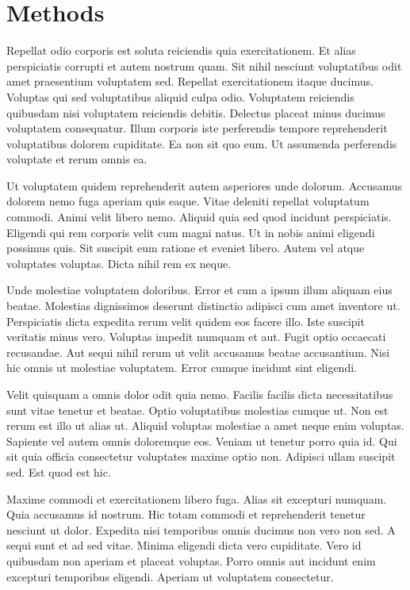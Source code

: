 \chapter{Methods\label{methods}}


Repellat odio corporis est soluta reiciendis quia exercitationem. Et alias perspiciatis corrupti et autem nostrum quam. Sit nihil nesciunt voluptatibus odit amet praesentium voluptatem sed. Repellat exercitationem itaque ducimus. Voluptas qui sed voluptatibus aliquid culpa odio. Voluptatem reiciendis quibusdam nisi voluptatem reiciendis debitis. Delectus placeat minus ducimus voluptatem consequatur. Illum corporis iste perferendis tempore reprehenderit voluptatibus dolorem cupiditate. Ea non sit quo eum. Ut assumenda perferendis voluptate et rerum omnis ea.

Ut voluptatem quidem reprehenderit autem asperiores unde dolorum. Accusamus dolorem nemo fuga aperiam quis eaque. Vitae deleniti repellat voluptatum commodi. Animi velit libero nemo. Aliquid quia sed quod incidunt perspiciatis. Eligendi qui rem corporis velit cum magni natus. Ut in nobis animi eligendi possimus quis. Sit suscipit eum ratione et eveniet libero. Autem vel atque voluptates voluptas. Dicta nihil rem ex neque.

Unde molestiae voluptatem doloribus. Error et cum a ipsum illum aliquam eius beatae. Molestias dignissimos deserunt distinctio adipisci cum amet inventore ut. Perspiciatis dicta expedita rerum velit quidem eos facere illo. Iste suscipit veritatis minus vero. Voluptas impedit numquam et aut. Fugit optio occaecati recusandae. Aut sequi nihil rerum ut velit accusamus beatae accusantium. Nisi hic omnis ut molestiae voluptatem. Error cumque incidunt sint eligendi.

Velit quisquam a omnis dolor odit quia nemo. Facilis facilis dicta necessitatibus sunt vitae tenetur et beatae. Optio voluptatibus molestias cumque ut. Non est rerum est illo ut alias ut. Aliquid voluptas molestiae a amet neque enim voluptas. Sapiente vel autem omnis doloremque eos. Veniam ut tenetur porro quia id. Qui sit quia officia consectetur voluptates maxime optio non. Adipisci ullam suscipit sed. Est quod est hic.

Maxime commodi et exercitationem libero fuga. Alias sit excepturi numquam. Quia accusamus id nostrum. Hic totam commodi et reprehenderit tenetur nesciunt ut dolor. Expedita nisi temporibus omnis ducimus non vero non sed. A sequi sunt et ad sed vitae. Minima eligendi dicta vero cupiditate. Vero id quibusdam non aperiam et placeat voluptas. Porro omnis aut incidunt enim excepturi temporibus eligendi. Aperiam ut voluptatem consectetur.

